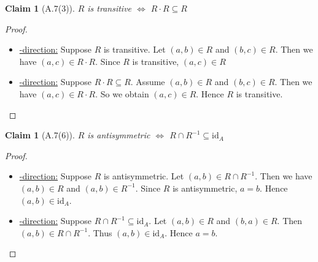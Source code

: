 \documentclass[12pt,aspectratio=169]{beamer}
\theoremstyle{claim}
\newtheorem{claim}[theorem]{Claim}%
\begin{document}
\begin{frame}
    \begin{claim}[A.7(3)]
        $R$ is transitive $\Leftrightarrow$ $R \cdot R \subseteq R$
    \end{claim}

    \begin{proof}
        \begin{itemize}
            \item \underline{\Rightarrow-direction:}
            Suppose $R$ is transitive.
            Let $(a,b) \in R$ and $(b,c) \in R$.
            Then we have $(a,c) \in R \cdot R$.
            Since $R$ is transitive, $(a,c) \in R$
            \item \underline{\Leftarrow-direction:}
            Suppose $R \cdot R \subseteq R$.
            Assume $(a,b) \in R$ and $(b,c) \in R$.
            Then we have $(a,c) \in R \cdot R$.
            So we obtain $(a,c) \in R$.
            Hence $R$ is transitive.
      \end{itemize}
    \end{proof}
\end{frame}

\begin{frame}
    \begin{claim}[A.7(6)]
        $R$ is antisymmetric $\Leftrightarrow$ $R \cap R^{-1} \subseteq \mathrm{id}_A$
    \end{claim}
    \begin{proof}
        \begin{itemize}
            \item \underline{\Rightarrow-direction:}
                Suppose $R$ is antisymmetric.
                Let $(a,b) \in R \cap R^{-1}$.
                Then we have $(a,b) \in R$ and $(a,b) \in R^{-1}$.
                Since $R$ is antisymmetric, $a=b$. Hence $(a,b) \in \mathrm{id}_A$.
            \item \underline{\Leftarrow-direction:}
                Suppose $R \cap R^{-1} \subseteq \mathrm{id}_A$.
                Let $(a,b) \in R$ and $(b,a) \in R$.
                Then $(a,b) \in R \cap R^{-1}$.
                Thus $(a,b) \in \mathrm{id}_A$.
                Hence $a = b$.
        \end{itemize}
    \end{proof}
\end{frame}
\end{document}
